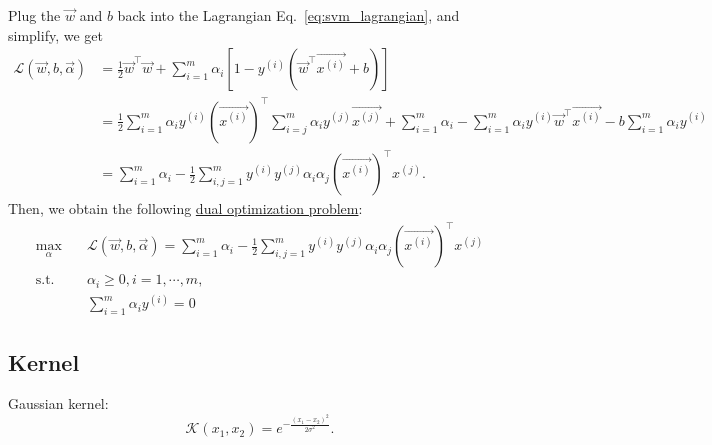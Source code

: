 \documentclass[10pt,onecolumn]{book}
\begin{document}
Plug the $\vec{w}$ and $b$ back into the Lagrangian Eq.~\ref{eq:svm_lagrangian}, and simplify, we get
\begin{equation}
\begin{split}
\mathcal{L}(\vec{w}, b, \vec{\alpha}) &= \frac{1}{2} \vec{w}^\top \vec{w} +  \sum_{i = 1}^m \alpha_i [1 - y^{(i)}(\vec{w}^\top \overrightarrow{x^{(i)}} + b)] \\
&= \frac{1}{2} \sum_{i=1}^m \alpha_i y^{(i)} (\overrightarrow{x^{(i)}})^\top \sum_{i=j}^m \alpha_i y^{(j)}\overrightarrow{x^{(j)}} + \sum_{i=1}^m \alpha_i - \sum_{i = 1}^m \alpha_i y^{(i)} \vec{w}^\top \overrightarrow{x^{(i)}} - b\sum_{i= 1}^m\alpha_i y^{(i)}\\
&= \sum_{i = 1}^m \alpha_i - \frac{1}{2} \sum_{i,j=1}^m y^{(i)} y^{(j)} \alpha_i \alpha_j(\overrightarrow{x^{(i)}})^\top x^{(j)}.
\end{split}
\end{equation}
Then, we obtain the following \uline{dual optimization problem}:
\begin{equation}
\begin{split}
\max_\alpha & \quad \mathcal{L}(\vec{w}, b, \vec{\alpha}) = \sum_{i = 1}^m \alpha_i - \frac{1}{2} \sum_{i,j=1}^m y^{(i)} y^{(j)} \alpha_i \alpha_j(\overrightarrow{x^{(i)}})^\top x^{(j)} \\
\text{s.t.} & \quad \alpha_i \geq 0, i=1,\cdots, m, \\
& \quad \sum_{i=1}^m \alpha_i y^{(i)} = 0
\end{split}
\end{equation}


\subsection{Kernel}
Gaussian kernel:
\begin{equation}
\mathcal{K}(x_1, x_2) = e^{-\frac{(x_1 - x_2)^2}{2 \sigma^2}}.
\end{equation}
\end{document}
